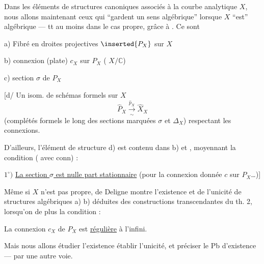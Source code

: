 Dans les éléments de structures canoniques associés à la courbe analytique $X$, nous allons  maintenant ceux qui ``gardent un sens algébrique'' lorsque $X$ ``est'' algébrique --- tt au moins dans le cas propre, grâce à .
Ce sont

a) Fibré en droites projectives $\inserted{P_X}$ sur $X$

b) connexion (plate) $c_X$ sur $P_X$ ( $X/\mathbb C$)

c) section $\sigma$ de $P_X$

[d/ Un isom. de schémas formels sur $X$
\[\widehat P_X\xrightarrow[\sim]{\widehat p_X}\widehat X_X\]
(complétés formels le long des sections marquées $\sigma$ et $\Delta_X$) respectant les connexions.

D'ailleurs, l'élément de structure d) est contenu dans b) et , moyennant la condition (  avec conn) :

$1^\circ)$ \uline{La section $\sigma$ est nulle part stationnaire} (pour la connexion donnée $c$ sur $P_X$\ldots)]

Même si $X$ n'est pas propre,  de Deligne montre l'existence et de l'unicité de structures algébriques a) b)  déduites des constructions transcendantes du th. 2, lorsqu'on  de plus la condition :

 La connexion $c_X$ de $P_X$ est \uline{régulière} à l'infini.

Mais nous allons étudier l'existence  établir l'unicité, et préciser le Pb d'existence --- par une autre voie.
